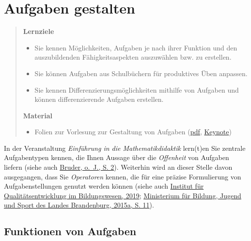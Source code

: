 \documentclass[
  ngerman,
]{scrbook}
\providecommand{\tightlist}{%
  \setlength{\itemsep}{0pt}\setlength{\parskip}{0pt}}
\theoremstyle{definition}
\theoremstyle{definition}
\theoremstyle{definition}
\theoremstyle{definition}
\theoremstyle{remark}
\begin{document}
\hypertarget{aufgaben-gestalten}{%
\chapter{Aufgaben gestalten}\label{aufgaben-gestalten}}

\begin{quote}
\textbf{Lernziele}

\begin{itemize}
\tightlist
\item
  Sie kennen Möglichkeiten, Aufgaben je nach ihrer Funktion und den auszubildenden Fähigkeitsaspekten auszuwählen bzw. zu erstellen.
\item
  Sie können Aufgaben aus Schulbüchern für produktives Üben anpassen.
\item
  Sie kennen Differenzierungsmöglichkeiten mithilfe von Aufgaben und können differenzierende Aufgaben erstellen.
\end{itemize}

\textbf{Material}

\begin{itemize}
\tightlist
\item
  Folien zur Vorlesung zur Gestaltung von Aufgaben (\href{files/Stoffdidaktik-WiSe2122-Kap10.pdf}{pdf}, \href{files/Stoffdidaktik-WiSe2122-Kap10.key}{Keynote})
\end{itemize}
\end{quote}

In der Veranstaltung \emph{Einführung in die Mathematikdidaktik} lern(t)en Sie zentrale Aufgabentypen kennen, die Ihnen Aussage über die \emph{Offenheit} von Aufgaben liefern (siehe auch \protect\hyperlink{ref-Bruder}{Bruder, o.~J., S. 2}). Weiterhin wird an dieser Stelle davon ausgegangen, dass Sie \emph{Operatoren} kennen, die für eine präzise Formulierung von Aufgabenstellungen genutzt werden können (siehe auch \protect\hyperlink{ref-InstitutfurQualitatsentwicklungimBildungswesen2019}{Institut für Qualitätsentwicklung im Bildungswesen, 2019}; \protect\hyperlink{ref-MinisteriumfurBildungJugendundSportdesLandesBrandenburg}{Ministerium für Bildung, Jugend und Sport des Landes Brandenburg, 2015a, S. 11}).

\hypertarget{funktionen-von-aufgaben}{%
\section{Funktionen von Aufgaben}\label{funktionen-von-aufgaben}}
\end{document}
